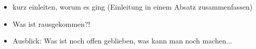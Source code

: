 
\begin{itemize}
\item kurz einleiten, worum es ging (Einleitung in einem Absatz zusammenfassen) 
\item Was ist rausgekommen?!
\item Ausblick: Was ist noch offen geblieben, was kann man noch machen...
\end{itemize}

\newpage

